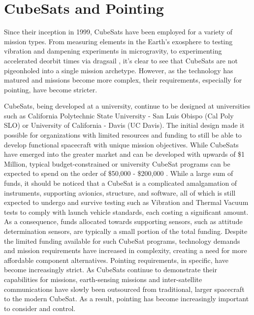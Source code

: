 \section{CubeSats and Pointing}

\par \qquad Since their inception in 1999, CubeSats have been employed for a variety of mission types. 
From measuring elements in the Earth's exosphere to testing vibration and dampening experiments in microgravity, to experimenting accelerated deorbit times via dragsail \cite{PolySat}, it's clear to see that CubeSats are not pigeonholed into a single mission archetype.
However, as the technology has matured and missions become more complex, their requirements, especially for pointing, have become stricter.

\par \qquad CubeSats, being developed at a university, continue to be designed at universities such as California Polytechnic State University - San Luis Obispo (Cal Poly SLO) or University of California - Davis (UC Davis).
The initial design made it possible for organizations with limited resources and funding to still be able to develop functional spacecraft with unique mission objectives. 
While CubeSats have emerged into the greater market and can be developed with upwards of \$1 Million, typical budget-constrained or university CubeSat programs can be expected to spend on the order of \$50,000 - \$200,000 \cite{SmallSatMarket}.
While a large sum of funds, it should be noticed that a CubeSat is a complicated amalgamation of instruments, supporting avionics, structure, and software, all of which is still expected to undergo and survive testing such as Vibration and Thermal Vacuum tests to comply with launch vehicle standards, each costing a significant amount.
As a consequence, funds allocated towards supporting sensors, such as attitude determination sensors, are typically a small portion of the total funding. 
Despite the limited funding available for such CubeSat programs, technology demands and mission requirements have increased in complexity, creating a need for more affordable component alternatives.
Pointing requirements, in specific, have become increasingly strict.
As CubeSats continue to demonstrate their capabilities for missions, earth-sensing missions and inter-satellite communications have slowly been outsourced from traditional, larger spacecraft to the modern CubeSat.
As a result, pointing has become increasingly important to consider and control.

